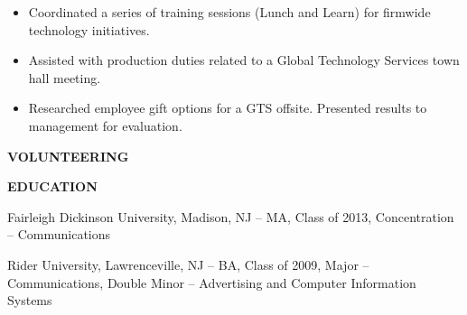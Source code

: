 \documentclass[letterpaper,12pt]{article}
\begin{document}
%
\begin{itemize}[nosep]
 \item
  Coordinated a series of training sessions (Lunch and Learn) for firmwide technology initiatives.
\item
  Assisted with production duties related to a Global Technology Services town hall meeting.
\item
  Researched employee gift options for a GTS offsite. Presented results to management for evaluation.
\end{itemize}
\begin{center}
\textbf{VOLUNTEERING}
\end{center}
%
%
\begin{center}
\textbf{EDUCATION}
\end{center}
\begin{raggedright}
Fairleigh Dickinson University, Madison, NJ – MA, Class of 2013, Concentration – Communications\\
\end{raggedright}
\vspace*{0.35cm}
\begin{raggedright}
Rider University, Lawrenceville, NJ – BA, Class of 2009, Major – Communications, Double Minor – Advertising and Computer Information Systems
\end{raggedright}
\end{document}
